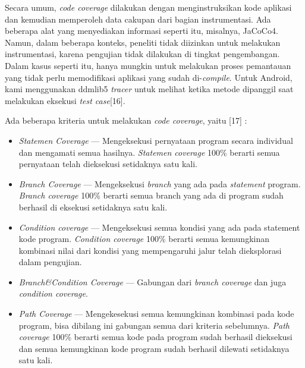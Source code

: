Secara umum, \textit{code coverage} dilakukan dengan menginstruksikan kode aplikasi dan kemudian memperoleh data cakupan dari bagian instrumentasi. Ada beberapa alat yang menyediakan informasi seperti itu, misalnya, JaCoCo4. Namun, dalam beberapa konteks, peneliti tidak diizinkan untuk melakukan instrumentasi, karena pengujian tidak dilakukan di tingkat pengembangan. Dalam kasus seperti itu, hanya mungkin untuk melakukan proses pemantauan yang tidak perlu memodifikasi aplikasi yang sudah di-\textit{compile}. Untuk Android, kami menggunakan ddmlib5 \textit{tracer} untuk melihat ketika metode dipanggil saat melakukan eksekusi \textit{test case}[16].

Ada beberapa kriteria untuk melakukan \textit{code coverage}, yaitu [17] :
\begin{itemize}
\item \textit{Statemen Coverage} --- Mengeksekusi pernyataan program secara individual dan mengamati semua hasilnya. \textit{Statemen coverage} 100\% berarti semua pernyataan telah dieksekusi setidaknya satu kali.
\item \textit{Branch Coverage} --- Mengeksekusi \textit{branch} yang ada pada \textit{statement} program. \textit{Branch coverage} 100\% berarti semua branch yang ada di program sudah berhasil di eksekusi setidaknya satu kali.
\item \textit{Condition coverage} --- Mengeksekusi semua kondisi yang ada pada statement kode program.
\textit{Condition coverage} 100\% berarti semua kemungkinan kombinasi nilai dari kondisi yang mempengaruhi jalur telah dieksplorasi dalam  pengujian.
\item \textit{Branch\&Condition Coverage} --- Gabungan dari \textit{branch coverage} dan juga \textit{condition coverage}.
\item \textit{Path Coverage} --- Mengekesekusi semua kemungkinan kombinasi pada kode program, bisa dibilang ini gabungan semua dari kriteria sebelumnya. \textit{Path coverage} 100\% berarti semua kode pada program sudah berhasil dieksekusi dan semua kemungkinan kode program sudah berhasil dilewati setidaknya satu kali.
\end{itemize}
